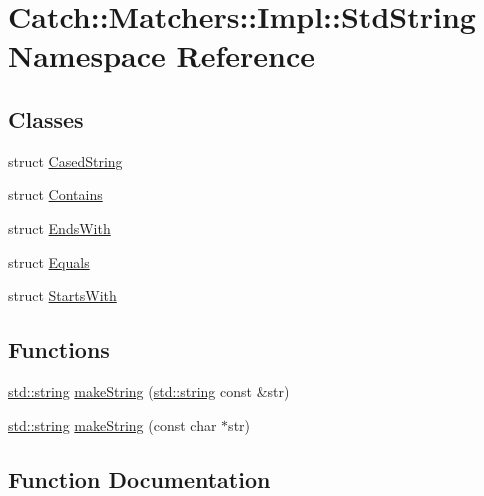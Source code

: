 \hypertarget{namespace_catch_1_1_matchers_1_1_impl_1_1_std_string}{}\section{Catch\+:\+:Matchers\+:\+:Impl\+:\+:Std\+String Namespace Reference}
\label{namespace_catch_1_1_matchers_1_1_impl_1_1_std_string}
\subsection*{Classes}
\begin{DoxyCompactItemize}
\item 
struct \hyperlink{struct_catch_1_1_matchers_1_1_impl_1_1_std_string_1_1_cased_string}{Cased\+String}
\item 
struct \hyperlink{struct_catch_1_1_matchers_1_1_impl_1_1_std_string_1_1_contains}{Contains}
\item 
struct \hyperlink{struct_catch_1_1_matchers_1_1_impl_1_1_std_string_1_1_ends_with}{Ends\+With}
\item 
struct \hyperlink{struct_catch_1_1_matchers_1_1_impl_1_1_std_string_1_1_equals}{Equals}
\item 
struct \hyperlink{struct_catch_1_1_matchers_1_1_impl_1_1_std_string_1_1_starts_with}{Starts\+With}
\end{DoxyCompactItemize}
\subsection*{Functions}
\begin{DoxyCompactItemize}
\item 
\hyperlink{_s_d_l__opengl__glext_8h_ae84541b4f3d8e1ea24ec0f466a8c568b}{std\+::string} \hyperlink{namespace_catch_1_1_matchers_1_1_impl_1_1_std_string_a1c41960bd2b455975e7be3cb87878fef}{make\+String} (\hyperlink{_s_d_l__opengl__glext_8h_ae84541b4f3d8e1ea24ec0f466a8c568b}{std\+::string} const \&str)
\item 
\hyperlink{_s_d_l__opengl__glext_8h_ae84541b4f3d8e1ea24ec0f466a8c568b}{std\+::string} \hyperlink{namespace_catch_1_1_matchers_1_1_impl_1_1_std_string_a42a104fb88baf158ed3b7d0d422afdaa}{make\+String} (const char $\ast$str)
\end{DoxyCompactItemize}


\subsection{Function Documentation}
